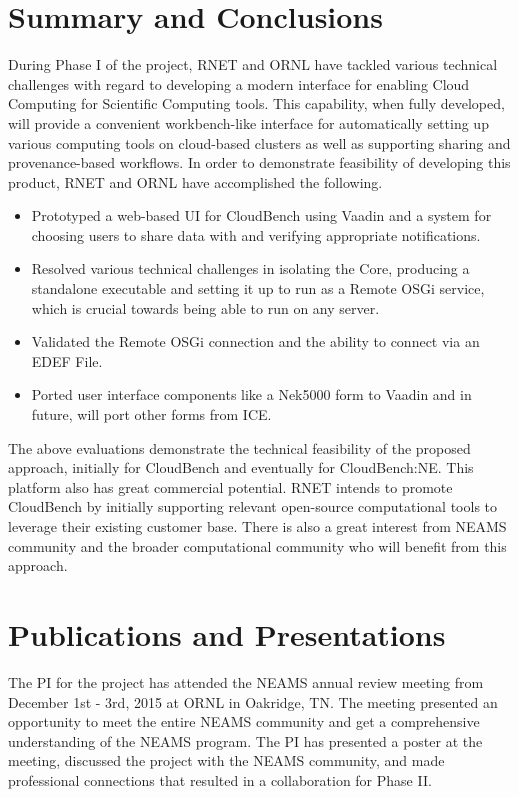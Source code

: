 \section{Summary and Conclusions}

During Phase I of the project, RNET and ORNL have tackled various technical 
challenges with regard to developing a modern interface for enabling Cloud 
Computing for Scientific Computing tools. This capability, when fully 
developed, will provide a convenient workbench-like interface for automatically 
setting up various computing tools on cloud-based clusters as well as 
supporting sharing and provenance-based workflows. In order to demonstrate 
feasibility of developing this product, RNET and ORNL have accomplished the 
following.

\begin{itemize}
\item Prototyped a web-based UI for CloudBench using Vaadin and a system for 
choosing users to share data with and verifying appropriate notifications.
\item Resolved various technical challenges in isolating the Core, producing a 
standalone executable and setting it up to run as a Remote OSGi service, which 
is crucial towards being able to run on any server.
\item Validated the Remote OSGi connection and the ability to connect via an 
EDEF File.
\item Ported user interface components like a Nek5000 form to Vaadin and in 
future, will port other forms from ICE.
\end{itemize}

The above evaluations demonstrate the technical feasibility of the proposed 
approach, initially for CloudBench and eventually for CloudBench:NE. This 
platform also has great commercial potential. RNET intends to promote 
CloudBench by initially supporting relevant open-source computational tools to 
leverage their existing customer base. There is also a great interest from 
NEAMS community and the broader computational community who will benefit from 
this approach.


\section{Publications and Presentations}

The PI for the project has attended the NEAMS annual review meeting from 
December 1st - 3rd, 2015 at ORNL in Oakridge, TN. The meeting presented an 
opportunity to meet the entire NEAMS community and get a comprehensive 
understanding of the NEAMS program. The PI has presented a poster at the 
meeting, discussed the project with the NEAMS community, and made
professional connections that resulted in a collaboration for Phase II.